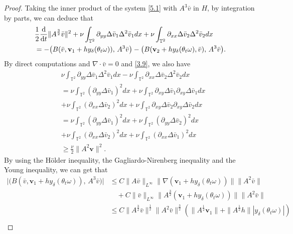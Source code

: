\documentclass{elsarticle}
\theoremstyle{definition}
\numberwithin{equation}{section}
\renewcommand{\d}{{\rm{d}}}
\begin{document}
\begin{proof} Taking the inner product of the system   \eqref{5.1} with $A^3\bar{v}$ in $H$,  by integration by parts, we can deduce that
\begin{align}\label{6.20}
&\frac{1}{2}\frac{\d}{\d t}\|A^{\frac32}\bar{v}\|^2+\nu \int_{\mathbb{T}^2}\partial_{yy}\Delta \bar{v}_1\Delta^2\bar{v}_1dx+\nu \int_{\mathbb{T}^2}\partial_{xx}\Delta \bar{v}_2\Delta^2 \bar{v}_2dx\nonumber\\
&=- \big (B(\bar{v},\textbf{v}_1+hy_\delta(\theta_t\omega)),\, A^3\bar{v}  \big )
- \big (B(\textbf{v}_2+hy_\delta(\theta_t\omega),\bar{v}),\, A^3\bar{v} \big ).
\end{align}
By direct computations and $\nabla\cdot \bar{v}=0$ and \eqref{3.9}, we also have
\begin{align}\label{6.19}
&\nu \int_{\mathbb{T}^2}\partial_{yy}\Delta \bar{v}_1\Delta^2 \bar{v}_1dx-\nu \int_{\mathbb{T}^2}\partial_{xx}\Delta \bar{v}_2\Delta^2 \bar{v}_2dx\nonumber\\
&= \nu \int_{\mathbb{T}^2}(\partial_{yy}\Delta \bar{v}_1)^2dx+\nu \int_{\mathbb{T}^2}\partial_{xy}\Delta \bar{v}_1\partial_{xy}\Delta \bar{v}_1dx\nonumber\\
&+\nu \int_{\mathbb{T}^2}(\partial_{xx}\Delta \bar{v}_2)^2dx+\nu \int_{\mathbb{T}^2}\partial_{xy}\Delta \bar{v}_2\partial_{xy}\Delta \bar{v}_2dx
\nonumber\\
&=\nu \int_{\mathbb{T}^2}(\partial_{yy}\Delta \bar{v}_1)^2dx+\nu \int_{\mathbb{T}^2}(\partial_{yy}\Delta \bar{v}_2)^2dx\nonumber\\
&+\nu \int_{\mathbb{T}^2}(\partial_{xx}\Delta \bar{v}_2)^2dx+\nu \int_{\mathbb{T}^2}(\partial_{xx}\Delta \bar{v}_1)^2dx
\nonumber\\
&\geq\frac\nu2\|A^2 \textbf{v}\|^2.
\end{align}
By using the H\"{o}lder inequality, the Gagliardo-Nirenberg inequality and the Young inequality, we can get that
\begin{align}\label{6.21}
 \big| \big(B(\bar{v},\textbf{v}_1+hy_\delta(\theta_t\omega)),\, A^3\bar{v}\big)
 \big| &\leq C\|A\bar{v}\|_{L^\infty}\|\nabla(\textbf{v}_1+hy_\delta(\theta_t\omega))\|\|A^2\bar{v}\|  \nonumber\\
&\quad
 +C\|\bar{v}\|_{L^\infty}\|A^\frac32(\textbf{v}_1+hy_\delta(\theta_t\omega))\|\|A^2\bar{v}\|
 \nonumber\\
&\leq C\|A^\frac32\bar{v}\|^\frac12\|A^2\bar{v}\|^\frac32
\left (\|A^\frac12\textbf{v}_1\|+\|A^\frac12h\||y_\delta(\theta_t\omega)| \right )\nonumber\\

\end{align}
\end{proof}
\end{document}
